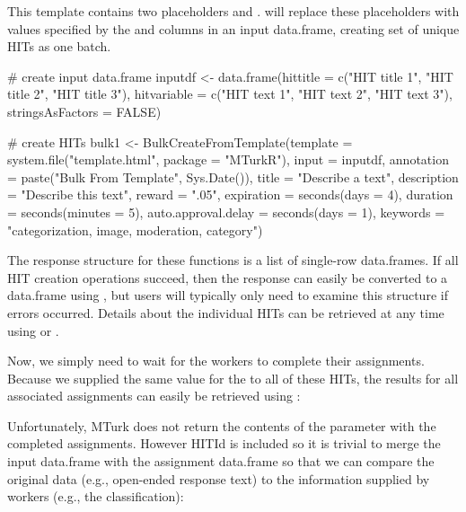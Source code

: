 \noindent This template contains two placeholders  and .  will replace these placeholders with values specified by the  and  columns in an input data.frame, creating set of unique HITs as one batch.

\begin{example}
# create input data.frame
inputdf <- data.frame(hittitle = c("HIT title 1", "HIT title 2", "HIT title 3"),
                      hitvariable = c("HIT text 1", "HIT text 2", "HIT text 3"), 
                      stringsAsFactors = FALSE)

# create HITs
bulk1 <- 
BulkCreateFromTemplate(template = system.file("template.html", package = "MTurkR"),
                       input = inputdf,
                       annotation = paste("Bulk From Template", Sys.Date()),
                       title = "Describe a text",
                       description = "Describe this text",
                       reward = ".05",
                       expiration = seconds(days = 4),
                       duration = seconds(minutes = 5),
                       auto.approval.delay = seconds(days = 1),
                       keywords = "categorization, image, moderation, category")
\end{example}

\noindent The response structure for these functions is a list of single-row data.frames. If all HIT creation operations succeed, then the response can easily be converted to a data.frame using , but users will typically only need to examine this structure if errors occurred. Details about the individual HITs can be retrieved at any time using  or .

Now, we simply need to wait for the workers to complete their assignments. Because we supplied the same value for the  to all of these HITs, the results for all associated assignments can easily be retrieved using :


\noindent Unfortunately, MTurk does not return the contents of the  parameter with the completed assignments. However HITId is included so it is trivial to merge the input data.frame with the assignment data.frame so that we can compare the original data (e.g., open-ended response text) to the information supplied by workers (e.g., the classification):

